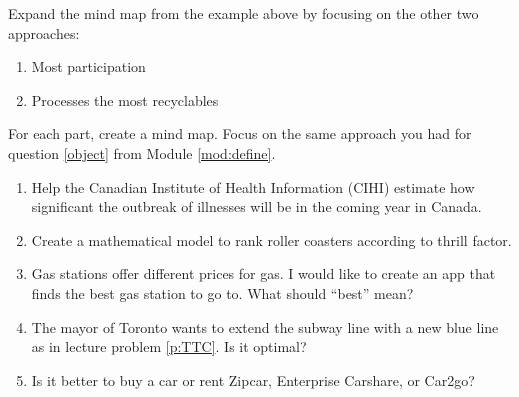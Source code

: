 \begin{exercises}
	\begin{problist}
		\prob
		Expand the mind map from the example above by focusing on the other two approaches:
		\begin{enumerate}
			\item Most participation
			\item Processes the most recyclables
		\end{enumerate}

		\prob
	For each part, create a mind map. Focus on the same approach you had for question \ref{object} from Module \ref{mod:define}.
		\begin{enumerate}
			\item Help the Canadian Institute of Health Information (CIHI) estimate how significant the outbreak of illnesses will be in the coming year in Canada.
			\item Create a mathematical model to rank roller coasters according to thrill factor.
			\item Gas stations offer different prices for gas. I would like to create an app that finds the best gas station to go to. What should ``best'' mean?
			\item The mayor of Toronto wants to extend the subway line with a new blue line as in lecture problem \ref{p:TTC}. Is it optimal?
			
			\item Is it better to buy a car or rent Zipcar, Enterprise Carshare, or Car2go?
		
	\end{enumerate}
	\end{problist}
\end{exercises}

